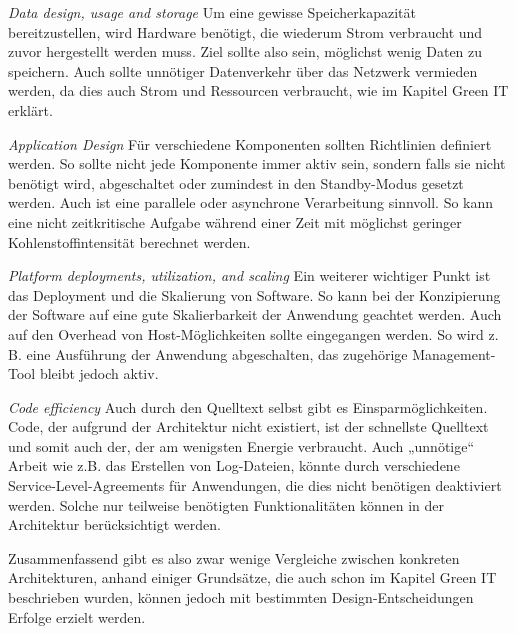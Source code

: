 \documentclass[utf8,biblatex]{lni}
\begin{document}
\textit{Data design, usage and storage} \newline
Um eine gewisse Speicherkapazität bereitzustellen, wird Hardware benötigt, die wiederum Strom verbraucht und zuvor hergestellt werden muss. Ziel sollte also sein, möglichst wenig Daten zu speichern. Auch sollte unnötiger Datenverkehr über das Netzwerk vermieden werden, da dies auch Strom und Ressourcen verbraucht, wie im Kapitel Green IT erklärt.


\textit{Application Design} \newline
Für verschiedene Komponenten sollten Richtlinien definiert werden. So sollte nicht jede Komponente immer aktiv sein, sondern falls sie nicht benötigt wird, abgeschaltet oder zumindest in den Standby-Modus gesetzt werden. Auch ist eine parallele oder asynchrone Verarbeitung sinnvoll. So kann eine nicht zeitkritische Aufgabe während einer Zeit mit möglichst geringer Kohlenstoffintensität berechnet werden.

\textit{Platform deployments, utilization, and scaling} \newline
Ein weiterer wichtiger Punkt ist das Deployment und die Skalierung von Software. So kann bei der Konzipierung der Software auf eine gute Skalierbarkeit der Anwendung geachtet werden. Auch auf den Overhead von Host-Möglichkeiten sollte eingegangen werden. So wird z. B. eine Ausführung der Anwendung abgeschalten, das zugehörige Management-Tool bleibt jedoch aktiv. 

\textit{Code efficiency} \newline
Auch durch den Quelltext selbst gibt es Einsparmöglichkeiten. Code, der aufgrund der Architektur nicht existiert, ist der schnellste Quelltext und somit auch der, der am wenigsten Energie verbraucht. Auch „unnötige“ Arbeit wie z.B. das Erstellen von Log-Dateien, könnte durch verschiedene Service-Level-Agreements für Anwendungen, die dies nicht benötigen deaktiviert werden. Solche nur teilweise benötigten Funktionalitäten können in der Architektur berücksichtigt werden. \cite{Eisele22}

Zusammenfassend gibt es also zwar wenige Vergleiche zwischen konkreten Architekturen, anhand einiger Grundsätze, die auch schon im Kapitel Green IT beschrieben wurden, können jedoch mit bestimmten Design-Entscheidungen Erfolge erzielt werden.
\end{document}
